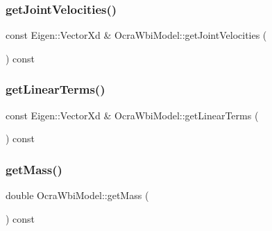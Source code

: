 \hypertarget{classocra__icub_1_1OcraWbiModel_a1dc6eb6a988b9833c33930e5e828e3c4}{}\label{classocra__icub_1_1OcraWbiModel_a1dc6eb6a988b9833c33930e5e828e3c4} 
\subsubsection{\texorpdfstring{get\+Joint\+Velocities()}{getJointVelocities()}}
{\footnotesize\ttfamily const Eigen\+::\+Vector\+Xd \& Ocra\+Wbi\+Model\+::get\+Joint\+Velocities (\begin{DoxyParamCaption}{ }\end{DoxyParamCaption}) const\hspace{0.3cm}{\ttfamily [virtual]}}

\hypertarget{classocra__icub_1_1OcraWbiModel_a08c2f48dfb8a6239efaa3d32cc92fa10}{}\label{classocra__icub_1_1OcraWbiModel_a08c2f48dfb8a6239efaa3d32cc92fa10} 
\subsubsection{\texorpdfstring{get\+Linear\+Terms()}{getLinearTerms()}}
{\footnotesize\ttfamily const Eigen\+::\+Vector\+Xd \& Ocra\+Wbi\+Model\+::get\+Linear\+Terms (\begin{DoxyParamCaption}{ }\end{DoxyParamCaption}) const\hspace{0.3cm}{\ttfamily [virtual]}}

\hypertarget{classocra__icub_1_1OcraWbiModel_a0d87a5d9c814db9ff24504890ef10395}{}\label{classocra__icub_1_1OcraWbiModel_a0d87a5d9c814db9ff24504890ef10395} 
\subsubsection{\texorpdfstring{get\+Mass()}{getMass()}}
{\footnotesize\ttfamily double Ocra\+Wbi\+Model\+::get\+Mass (\begin{DoxyParamCaption}{ }\end{DoxyParamCaption}) const\hspace{0.3cm}{\ttfamily [virtual]}}

